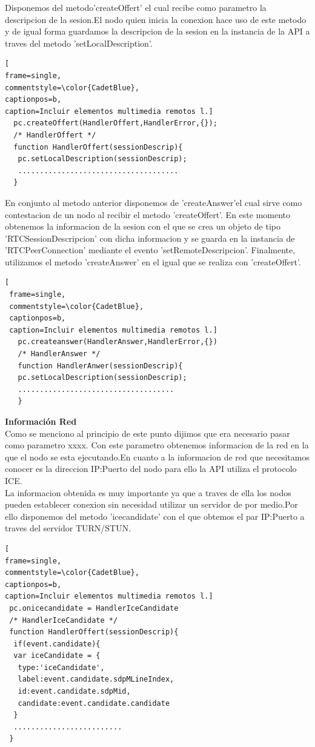 Disponemos del metodo'createOffert' el cual recibe como parametro la descripcion de la sesion.El nodo quien inicia la conexion hace uso de este metodo y de igual forma guardamos la descripcion de la sesion en la instancia de la API a traves del metodo 'setLocalDescription'.
\begin{lstlisting}[
frame=single,
commentstyle=\color{CadetBlue},
captionpos=b,
caption=Incluir elementos multimedia remotos l.]
  pc.createOffert(HandlerOffert,HandlerError,{});
  /* HandlerOffert */
  function HandlerOffert(sessionDescrip){
   pc.setLocalDescription(sessionDescrip);
   .....................................
  }
\end{lstlisting}
En conjunto al metodo anterior disponemos de 'createAnswer'el cual sirve como contestacion de un nodo al recibir el metodo 'createOffert'.
En este momento obtenemos la informacion de la sesion con el que se crea un objeto de tipo 'RTCSessionDescripcion' con dicha informacion y se guarda en la instancia de 'RTCPeerConnection' mediante el evento 'setRemoteDescripcion'.
Finalmente, utilizamos el metodo 'createAnswer' en el igual que se  realiza con 'createOffert'.
 \begin{lstlisting}[
 frame=single,
 commentstyle=\color{CadetBlue},
 captionpos=b,
 caption=Incluir elementos multimedia remotos l.]
   pc.createanswer(HandlerAnswer,HandlerError,{})
   /* HandlerAnswer */
   function HandlerAnwer(sessionDescrip){
   pc.setLocalDescription(sessionDescrip);
   ....................................
   }
\end{lstlisting}
 \textbf{Información Red} 
\\Como se menciono al principio de este punto dijimos que era necesario pasar como parametro xxxx. Con este parametro obtenemos informacion de la red en la que el nodo se esta ejecutando.En cuanto a la informacion de red que necesitamos conocer es la direccion IP:Puerto del nodo para ello la API utiliza el protocolo ICE.
\\La informacion obtenida es muy importante ya que a traves de ella los nodos pueden establecer conexion sin necesidad utilizar un servidor de por medio.Por ello disponemos del metodo 'icecandidate'  con el que obtemos el par IP:Puerto  a traves del servidor TURN/STUN.
\begin{lstlisting}[
frame=single,
commentstyle=\color{CadetBlue},
captionpos=b,
caption=Incluir elementos multimedia remotos l.]
 pc.onicecandidate = HandlerIceCandidate
 /* HandlerIceCandidate */
 function HandlerOffert(sessionDescrip){
  if(event.candidate){
  var iceCandidate = {
   type:'iceCandidate',
   label:event.candidate.sdpMLineIndex,
   id:event.candidate.sdpMid,
   candidate:event.candidate.candidate
  }
  .........................	
 }
\end{lstlisting}
